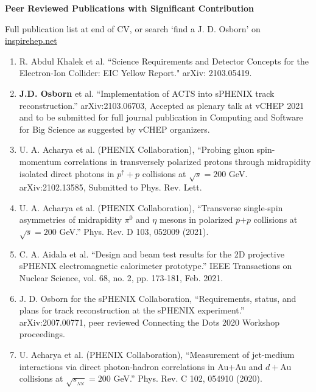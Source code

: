 \documentclass[11pt]{article}
\begin{document}
\begin{flushleft}
\LARGE\textbf{Peer Reviewed Publications with Significant Contribution}
\vspace{4pt}

\small 
Full publication list at end of CV, or search `find a J. D. Osborn' on \href{inspirehep.net}{inspirehep.net} 
\begin{center}
\normalsize
\begin{enumerate}
	\item R. Abdul Khalek et al. ``Science Requirements and Detector Concepts for the Electron-Ion Collider: EIC Yellow Report." arXiv: 2103.05419. 
	
	\item {\textbf{J.D. Osborn}} et al. ``Implementation of ACTS into sPHENIX track reconstruction.'' arXiv:2103.06703, Accepted as plenary talk at vCHEP 2021 and to be submitted for full journal publication in Computing and Software for Big Science as suggested by vCHEP organizers.
	
	\item U. A. Acharya et al. (PHENIX Collaboration), ``Probing gluon spin-momentum correlations in transversely polarized protons through midrapidity isolated direct photons in $p^\uparrow+p$ collisions at $\sqrt{s}=200$ GeV. arXiv:2102.13585, Submitted to Phys. Rev. Lett.
	
	\item U. A. Acharya et al. (PHENIX Collaboration), ``Transverse single-spin asymmetries of midrapidity $\pi^0$ and $\eta$ mesons in polarized $p$$+$$p$ collisions at $\sqrt{s}=200$ GeV.'' Phys. Rev. D 103, 052009 (2021).
	
	\item C. A. Aidala et al. ``Design and beam test results for the 2D projective sPHENIX electromagnetic calorimeter prototype.'' IEEE Transactions on Nuclear Science, vol. 68, no. 2, pp. 173-181, Feb. 2021.
	
	\item J. D. Osborn for the sPHENIX Collaboration, ``Requirements, status, and plans for track reconstruction at the sPHENIX experiment.'' arXiv:2007.00771, peer reviewed Connecting the Dots 2020 Workshop proceedings.
	
	\item U. Acharya et al. (PHENIX Collaboration), ``Measurement of jet-medium interactions via direct photon-hadron correlations in Au+Au and $d+$Au collisions at $\sqrt{s_{_{NN}}}=200$ GeV.'' Phys. Rev. C 102, 054910 (2020).
	

\end{enumerate}
\end{center}
\end{flushleft}
\end{document}
